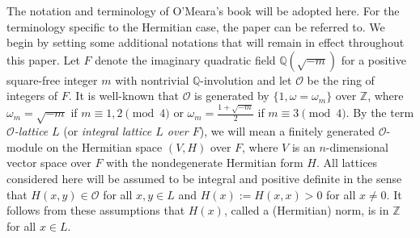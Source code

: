 \documentclass[a4paper,10pt,reqno]{amsart}
\begin{document}
The notation and terminology of O'Meara's book \cite{oO_73} will be adopted here. For the
terminology specific to the Hermitian case, the paper \cite{nJ_40} can be referred to.  We begin by
setting some additional notations that will remain in effect throughout this paper. Let $F$ denote
the imaginary quadratic field ${\mathbb{Q}(\sqrt{{-m}})}$ for a positive square-free integer $m$ with nontrivial
$\mathbb{Q}$-involution and let ${\mathcal{O}}$ be the ring of integers of $F$. It is well-known that
${\mathcal{O}}$ is generated by $\{1, \omega=\omega_{m}\}$ over ${\mathbb{Z}}$, where $\omega_{m} = \sqrt{-m}$ if $m
\equiv 1, 2 \pmod{4}$ or $\omega_{m} = \frac{1+\sqrt{-m}}2$ if $m \equiv 3 \pmod{4}$. By the term
\emph{ ${\mathcal{O}}$-lattice} $L$ (or \emph{integral lattice $L$ over $F$}), we will mean a finitely
generated ${\mathcal{O}}$-module on the Hermitian space $(V,H)$ over $F$, where $V$ is an $n$-dimensional
vector space over $F$ with the nondegenerate Hermitian form $H$. All lattices considered here will
be assumed to be integral and positive definite in the sense that $H(x,y) \in {\mathcal{O}}$ for all $x, y
\in L$ and $H(x):=H(x,x) > 0$ for all $x \ne 0$. It follows from these assumptions that $H(x)$,
called a (Hermitian) norm, is in $\mathbb{Z}$ for all $x \in L$.
\end{document}
